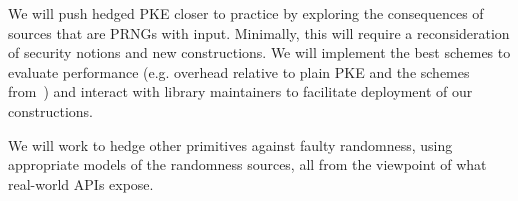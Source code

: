 \begin{task}
We will push hedged PKE closer to practice by exploring the
consequences of sources that are PRNGs with input.  Minimally, this will require
a reconsideration of security notions and new constructions.  We will
implement the best schemes to evaluate performance (e.g. overhead
relative to plain PKE and the schemes from~\cite{BPS}) and interact
with library maintainers to facilitate deployment of our constructions.
\end{task}

\begin{task}
We will work to hedge other primitives against faulty randomness,
using appropriate models of the randomness sources, all from the
viewpoint of what real-world APIs expose.
\end{task}


